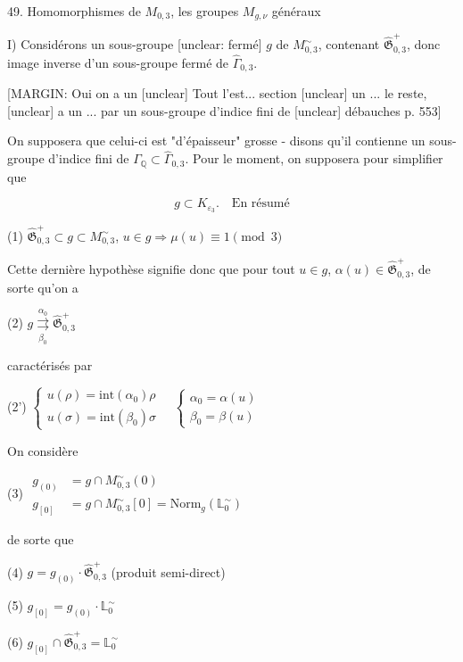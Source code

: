 
49. Homomorphismes de $M_{0,3}$, les groupes $M_{g,\nu}$ généraux

I) Considérons un sous-groupe [unclear: fermé] $g$ de $M_{0,3}^\sim$, contenant $\widehat{\mathfrak{G}}_{0,3}^+$, donc image inverse d'un sous-groupe fermé de $\widehat{\Gamma}_{0,3}$.

[MARGIN: Oui on a un [unclear] Tout l'est... section [unclear] un ... le reste, [unclear] a un ... par un sous-groupe d'indice fini de [unclear] débauches p. 553]

On supposera que celui-ci est "d'épaisseur" grosse - disons qu'il contienne un sous-groupe d'indice fini de $\Gamma_{\mathbb{Q}} \subset \widehat{\Gamma}_{0,3}$. Pour le moment, on supposera pour simplifier que

$$g \subset K_{\varepsilon_3} . \quad \text{En résumé}$$

(1) $\widehat{\mathfrak{G}}_{0,3}^+ \subset g \subset M_{0,3}^\sim$, $u \in g \Rightarrow \mu(u) \equiv 1 \pmod 3$

Cette dernière hypothèse signifie donc que pour tout $u \in g$, $\alpha(u) \in \widehat{\mathfrak{G}}_{0,3}^+$, de sorte qu'on a

(2) $g \underset{\beta_0}{\overset{\alpha_0}{\rightrightarrows}} \widehat{\mathfrak{G}}_{0,3}^+$

caractérisés par

(2') $\begin{cases} u(\rho) = \text{int}(\alpha_0)\rho \\ u(\sigma) = \text{int}(\beta_0)\sigma \end{cases} \quad \begin{cases} \alpha_0 = \alpha(u) \\ \beta_0 = \beta(u) \end{cases}$

On considère

(3) $\begin{aligned} g_{(0)} &= g \cap M_{0,3}^\sim(0) \\ g_{[0]} &= g \cap M_{0,3}^\sim[0] = \text{Norm}_g(\mathbb{L}_0^\sim) \end{aligned}$

de sorte que

(4) $g = g_{(0)} \cdot \widehat{\mathfrak{G}}_{0,3}^+$ (produit semi-direct)

(5) $g_{[0]} = g_{(0)} \cdot \mathbb{L}_0^\sim$

(6) $g_{[0]} \cap \widehat{\mathfrak{G}}_{0,3}^+ = \mathbb{L}_0^\sim$

